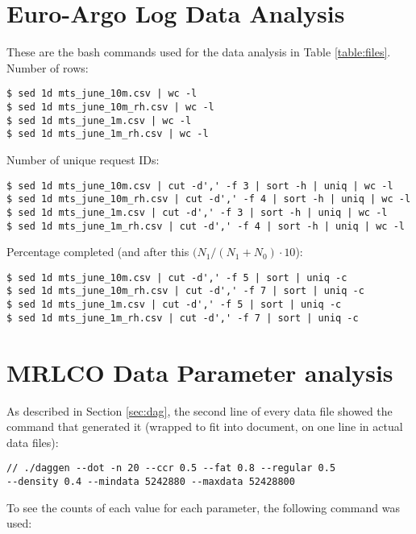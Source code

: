 \appendix

\chapter{Euro-Argo Log Data Analysis}\label{app:dataset}

These are the bash commands used for the data analysis in Table
\ref{table:files}.\\

\noindent Number of rows:
\begin{verbatim}
$ sed 1d mts_june_10m.csv | wc -l
$ sed 1d mts_june_10m_rh.csv | wc -l
$ sed 1d mts_june_1m.csv | wc -l
$ sed 1d mts_june_1m_rh.csv | wc -l
\end{verbatim}


\noindent Number of unique request IDs:
\begin{verbatim}
$ sed 1d mts_june_10m.csv | cut -d',' -f 3 | sort -h | uniq | wc -l
$ sed 1d mts_june_10m_rh.csv | cut -d',' -f 4 | sort -h | uniq | wc -l
$ sed 1d mts_june_1m.csv | cut -d',' -f 3 | sort -h | uniq | wc -l
$ sed 1d mts_june_1m_rh.csv | cut -d',' -f 4 | sort -h | uniq | wc -l
\end{verbatim}

\noindent Percentage completed (and after this $(N_{1} / (N_{1} + N_{0}) \cdot 10$):
\begin{verbatim}
$ sed 1d mts_june_10m.csv | cut -d',' -f 5 | sort | uniq -c
$ sed 1d mts_june_10m_rh.csv | cut -d',' -f 7 | sort | uniq -c
$ sed 1d mts_june_1m.csv | cut -d',' -f 5 | sort | uniq -c
$ sed 1d mts_june_1m_rh.csv | cut -d',' -f 7 | sort | uniq -c
\end{verbatim}


\chapter{MRLCO Data Parameter analysis}\label{app:mrlco}

As described in Section \ref{sec:dag}, the second line of every data file
showed the command that generated it (wrapped to fit into document, on one
line in actual data files):

\begin{verbatim}
// ./daggen --dot -n 20 --ccr 0.5 --fat 0.8 --regular 0.5
--density 0.4 --mindata 5242880 --maxdata 52428800
\end{verbatim}

To see the counts of each value for each parameter, the following command was
used:

